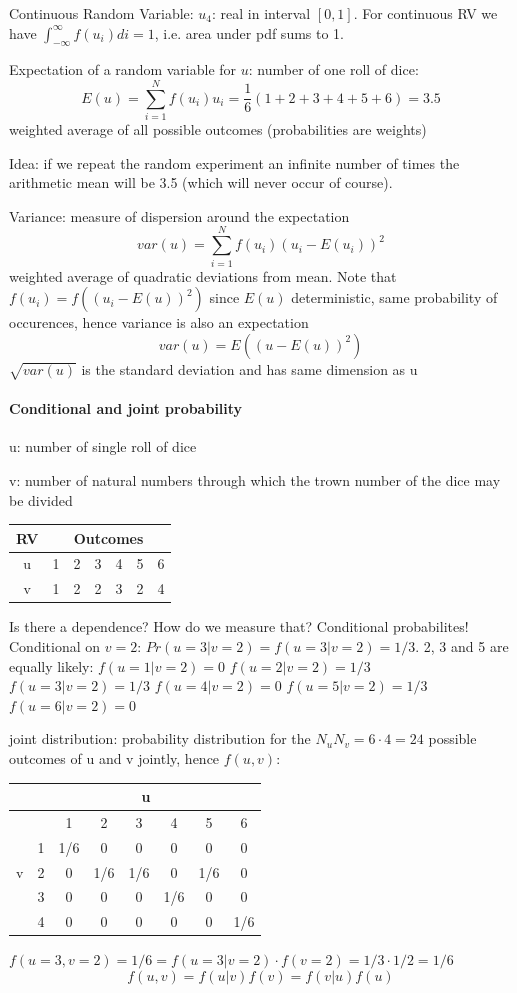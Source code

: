 \documentclass{article}
\begin{document}
Continuous Random Variable: $u_4$: real in interval $[0,1]$. For continuous RV we have $\int_{-\infty}^{\infty} f(u_i)di = 1$, i.e. area under pdf sums to 1.

Expectation of a random variable for $u$: number of one roll of dice:
$$E(u)=\sum_{i=1}^N f(u_i) u_i = \frac{1}{6}(1+2+3+4+5+6) = 3.5$$
weighted average of all possible outcomes (probabilities are weights)

Idea: if we repeat the random experiment an infinite number of times the arithmetic mean will be 3.5 (which will never occur of course).

Variance: measure of dispersion around the expectation
$$var(u) = \sum_{i=1}^{N}f(u_i) (u_i - E(u_i))^2$$
weighted average of quadratic deviations from mean. Note that $f(u_i) = f((u_i-E(u))^2)$ since $E(u)$ deterministic, same probability of occurences, hence variance is also an expectation $$var(u) = E((u-E(u))^2)$$
$\sqrt{var(u)}$ is the standard deviation and has same dimension as u

\paragraph{Conditional and joint probability}
u: number of single roll of dice

v: number of natural numbers through which the trown number of the dice may be divided

\begin{tabular}{c|cccccc}
	\hline 
	RV& \multicolumn{6}{c|}{Outcomes} \\ 
	\hline 
	u& 1 & 2 & 3 & 4 & 5 & 6 \\ 
	\hline 
	v& 1 & 2 & 2 & 3 & 2 & 4 \\ 
	\hline 
\end{tabular} 
Is there a dependence? How do we measure that? Conditional probabilites! Conditional on $v=2$: $Pr(u=3|v=2)=f(u=3|v=2)=1/3$. 2, 3 and 5 are equally likely:
$f(u=1|v=2)=0$
$f(u=2|v=2)=1/3$
$f(u=3|v=2)=1/3$
$f(u=4|v=2)=0$
$f(u=5|v=2)=1/3$
$f(u=6|v=2)=0$

joint distribution: probability distribution for the $N_u N_v = 6\cdot 4=24$ possible outcomes of u and v jointly, hence $f(u,v)$:
\begin{tabular}{|c|c|c|c|c|c|c|c|}
	\hline 
	& \multicolumn{7}{c|}{u} \\ 
	\hline 
	&  & 1 & 2 & 3 & 4 & 5 & 6 \\ 
	\hline 
	& 1 & 1/6 & 0 & 0 & 0 & 0 & 0 \\ 
	\hline 
	v & 2 & 0 & 1/6 & 1/6 & 0 & 1/6 & 0 \\ 
	\hline 
	& 3 & 0 & 0 & 0 & 1/6 & 0 & 0 \\ 
	\hline 
	& 4 & 0 & 0 & 0 & 0 & 0 & 1/6 \\ 
	\hline 
\end{tabular} 
$f(u=3,v=2) = 1/6 = f(u=3|v=2)\cdot f(v=2) = 1/3 \cdot 1/2 = 1/6$
$$f(u,v) = f(u|v) f(v) = f(v|u) f(u)$$
\end{document}
